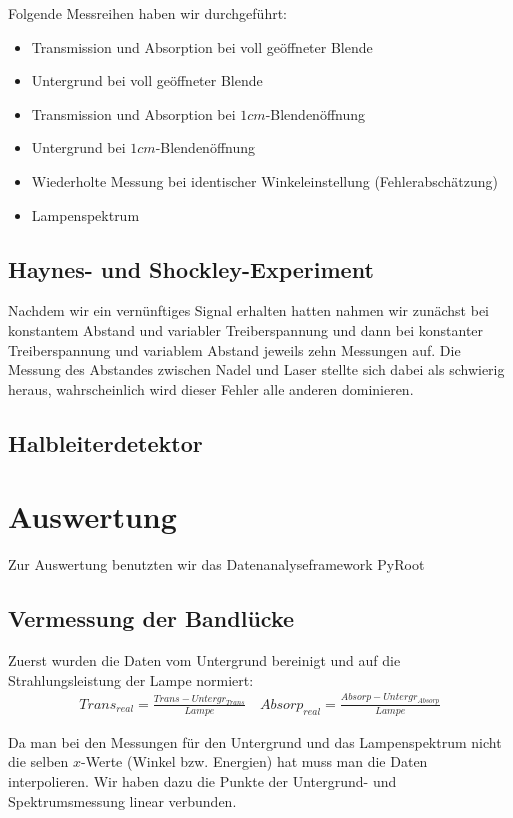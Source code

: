 \documentclass[12pt]{article}
\begin{document}
Folgende Messreihen haben wir durchgeführt:
\begin{itemize}
 \item Transmission und Absorption bei voll geöffneter Blende
 \item Untergrund bei voll geöffneter Blende
 \item Transmission und Absorption bei $1cm$-Blendenöffnung
 \item Untergrund bei $1cm$-Blendenöffnung
 \item Wiederholte Messung bei identischer Winkeleinstellung (Fehlerabschätzung)
 \item Lampenspektrum
\end{itemize}

\subsection{Haynes- und Shockley-Experiment}
Nachdem wir ein vernünftiges Signal erhalten hatten nahmen wir zunächst bei konstantem Abstand und variabler Treiberspannung und dann bei konstanter Treiberspannung und variablem Abstand jeweils zehn Messungen auf.
Die Messung des Abstandes zwischen Nadel und Laser stellte sich dabei als schwierig heraus, wahrscheinlich wird dieser Fehler alle anderen dominieren.

\subsection{Halbleiterdetektor}

\section{Auswertung}
Zur Auswertung benutzten wir das Datenanalyseframework PyRoot

\subsection{Vermessung der Bandlücke}
Zuerst wurden die Daten vom Untergrund bereinigt und auf die Strahlungsleistung der Lampe normiert:
\begin{align}
 Trans_{real} = \frac{Trans - Untergr_{Trans}}{Lampe} \quad Absorp_{real} = \frac{Absorp - Untergr_{Absorp}}{Lampe}
\end{align}

Da man bei den Messungen für den Untergrund und das Lampenspektrum nicht die selben $x$-Werte (Winkel bzw. Energien) hat muss man die Daten interpolieren. Wir haben dazu die Punkte der Untergrund- und Spektrumsmessung linear verbunden.
\end{document}
